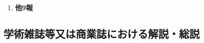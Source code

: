 \documentclass[11pt,a4paper,uplatex,twoside,dvipdfmx]{ujarticle} 	%
\renewcommand{\emph}[1]{{\sffamily\gtfamily\bfseries #1}}
\renewcommand{\bf}{\bfseries\sffamily\gtfamily}
\newcommand{\研究課題名}{\mgfamily ストカスティック形式、原始ブラックホール、重力波観測から迫るインフレーション}
\newcommand{\研究機関名}{\mgfamily 名古屋大学}
\newcommand{\申請者氏名}{\mgfamily 多田 祐一郎}
\newcommand{\研究代表者氏名}{\申請者氏名}
\newcommand{\研究期間の最終元号年度}{34}	%
\begin{document}
{\begin{enumerate}
		
		\item[] \emph{他9報}
	\end{enumerate}
	
	
				

}

\subsection{学術雑誌等又は商業誌における解説・総説}
\newcommand{\学術雑誌等または商業誌における解説や総説}{%
	$\,\,$ なし
		
}
\end{document}
